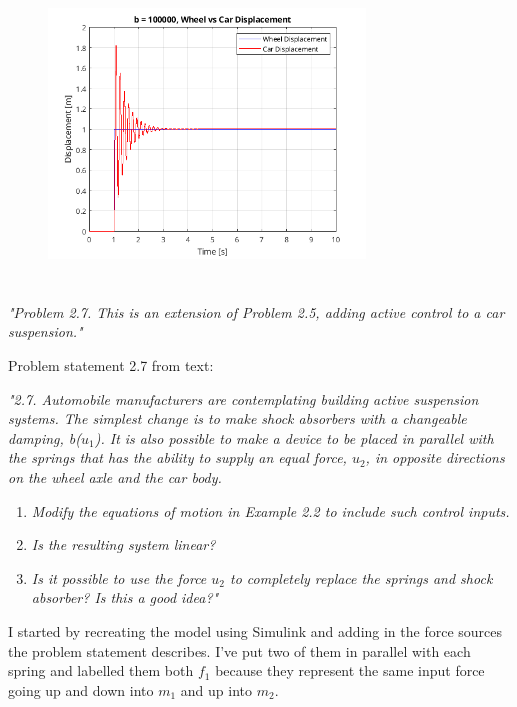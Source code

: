 \documentclass{article}
\begin{document}
\begin{figure}[H]
    \centering
    \includegraphics[width=0.75\textwidth]{b100000sim.png}
\end{figure}

\section{}

\textit{
    "Problem 2.7. This is an extension of Problem 2.5, adding active control to a car
    suspension."
}

Problem statement 2.7 from text:

\textit{
    "2.7. Automobile manufacturers are contemplating building active suspension systems. The simplest change is to make shock absorbers with a changeable damping, 
    b($u_1$). It is also possible to make a device to be placed in parallel with the springs that has the ability to supply an equal force, 
    $u_2$, in opposite directions on the wheel axle and the car body.
}
\begin{enumerate}[label=\alph*)]
    \item \textit{Modify the equations of motion in Example 2.2 to include such control inputs.}
    \item \textit{Is the resulting system linear?}
    \item \textit{Is it possible to use the force $u_2$ to completely replace the springs and shock absorber? Is this a good idea?"}
\end{enumerate}

I started by recreating the model using Simulink and adding in the force sources the problem statement describes.
I've put two of them in parallel with each spring and labelled them both $f_1$ because they represent the same input force going up and down into $m_1$ and up into $m_2$.
\end{document}
